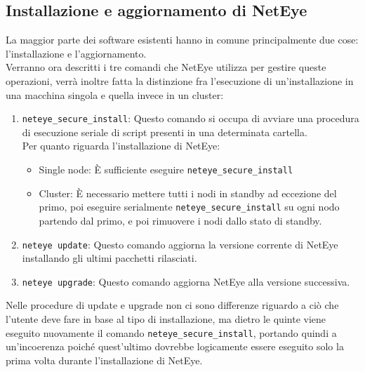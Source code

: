 \subsection{Installazione e aggiornamento di NetEye}
\label{sub:install_update} La maggior parte dei software esistenti hanno in comune
principalmente due cose: l'installazione e l'aggiornamento.\\ Verranno ora
descritti i tre comandi che NetEye utilizza per gestire queste operazioni, verrà
inoltre fatta la distinzione fra l'esecuzione di un'installazione in una macchina
singola e quella invece in un cluster:
\begin{enumerate}
  \item \texttt{neteye\_secure\_install}: Questo comando si occupa di avviare una
    procedura di esecuzione seriale di script presenti in una determinata cartella.\\
    Per quanto riguarda l'installazione di NetEye:
    \begin{itemize}
      \item Single node: È sufficiente eseguire \texttt{neteye\_secure\_install}

      \item Cluster: È necessario mettere tutti i nodi in standby ad eccezione
        del primo, poi eseguire serialmente \texttt{neteye\_secure\_install} su
        ogni nodo partendo dal primo, e poi rimuovere i nodi dallo stato di standby.
    \end{itemize}

  \item \texttt{neteye update}: Questo comando aggiorna la versione corrente di NetEye
    installando gli ultimi pacchetti rilasciati.\\

  \item \texttt{neteye upgrade}: Questo comando aggiorna NetEye alla versione successiva.
\end{enumerate}
Nelle procedure di update e upgrade non ci sono differenze riguardo a ciò che l'utente
deve fare in base al tipo di installazione, ma dietro le quinte viene eseguito nuovamente
il comando \texttt{neteye\_secure\_install}, portando quindi a un'incoerenza poiché
quest'ultimo dovrebbe logicamente essere eseguito solo la prima volta durante l'installazione
di NetEye.

